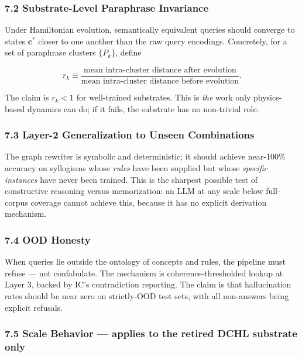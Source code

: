 \documentclass[
  11pt,
  a4paper,
]{article}
\begin{document}
\subsubsection{7.2 Substrate-Level Paraphrase
Invariance}\label{substrate-level-paraphrase-invariance}

Under Hamiltonian evolution, semantically equivalent queries should
converge to states \(\mathbf{c}^*\) closer to one another than the raw
query encodings. Concretely, for a set of paraphrase clusters
\(\{P_k\}\), define

\[
r_k \equiv \frac{\text{mean intra-cluster distance after evolution}}{\text{mean intra-cluster distance before evolution}}.
\]

The claim is \(r_k < 1\) for well-trained substrates. This is \emph{the}
work only physics-based dynamics can do; if it fails, the substrate has
no non-trivial role.

\subsubsection{7.3 Layer-2 Generalization to Unseen
Combinations}\label{layer-2-generalization-to-unseen-combinations}

The graph rewriter is symbolic and deterministic; it should achieve
near-100\% accuracy on syllogisms whose \emph{rules} have been supplied
but whose \emph{specific instances} have never been trained. This is the
sharpest possible test of constructive reasoning versus memorization: an
LLM at any scale below full-corpus coverage cannot achieve this, because
it has no explicit derivation mechanism.

\subsubsection{7.4 OOD Honesty}\label{ood-honesty}

When queries lie outside the ontology of concepts and rules, the
pipeline must refuse --- not confabulate. The mechanism is
coherence-thresholded lookup at Layer 3, backed by IC's contradiction
reporting. The claim is that hallucination rates should be near zero on
strictly-OOD test sets, with all non-answers being explicit refusals.

\subsubsection{\texorpdfstring{7.5 Scale Behavior --- \textbf{applies to
the retired DCHL substrate
only}}{7.5 Scale Behavior --- applies to the retired DCHL substrate only}}\label{scale-behavior-applies-to-the-retired-dchl-substrate-only}
\end{document}
